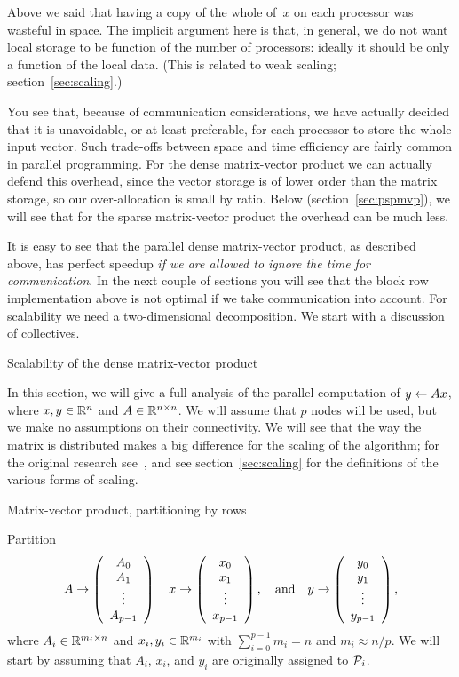 Above we said that having a copy of the whole of~$x$ on each processor
was wasteful in space. The implicit argument here is that, in general,
we do not want local storage to be function of the number of
processors: ideally it should be only a function of the local
data. (This is related to weak scaling; section~\ref{sec:scaling}.)

You see that, because of communication considerations, we have
actually decided that it is unavoidable, or at least preferable, for
each processor to store the whole input vector.  Such trade-offs
between space and time efficiency are fairly common in parallel
programming. For the dense matrix-vector product we can actually
defend this overhead, since the vector storage is of lower order than
the matrix storage, so our over-allocation is small by ratio. Below
(section~\ref{sec:pspmvp}), we will see that for the sparse
matrix-vector product the overhead can be much less.

It is easy to see that the parallel dense matrix-vector product, as
described above, has perfect speedup \emph{if we are allowed to ignore
the time for communication}. In the next couple of sections you will
see that the block row implementation above is not optimal if we take
communication into account. For scalability we need a two-dimensional
decomposition. We start with a discussion of collectives.

 {Scalability of the dense matrix-vector product}
\label{sec:densescaling}



In this section, we will give a full analysis of the parallel
computation of $ y \leftarrow A x $, where $ x, y \in \mathbb{R}^{n} $ and $ A \in
\mathbb{R}^{n \times n} $.  We will assume that $ p $ nodes will be used, but we make no
assumptions on their connectivity. We will see that the way the matrix
is distributed makes a big difference for the scaling of the
algorithm; for the original research
see~\cite{HeWo:94,Schreiber:scalability92,Stewart90}, and see
section~\ref{sec:scaling} for the definitions of the various forms of
scaling.

 {Matrix-vector product, partitioning by rows}
\label{sec:mvp-by-rows}

Partition
\[
A \rightarrow \left( \begin{array}{c} A_0 \\ A_1 \\ \vdots \\ A_{p-1} \end{array} \right) 
\quad
x \rightarrow \left( \begin{array}{c} x_0 \\ x_1 \\ \vdots \\ x_{p-1} \end{array} \right) ,
\quad
\mbox{and}
\quad
y \rightarrow \left( \begin{array}{c} y_0 \\ y_1 \\ \vdots \\ y_{p-1} \end{array} \right) ,
\]
where $ A_i \in \mathbb{R}^{m_i \times n} $ and $ x_i, y_i \in \mathbb{R}^{m_i} $ with
$ \sum_{i=0}^{p-1} m_i = n $ and $ m_i \approx n / p $.
We will start by assuming
that $ A_i $, $ x_i $, and $ y_i $ are originally assigned to $ {\cal P}_i $.

